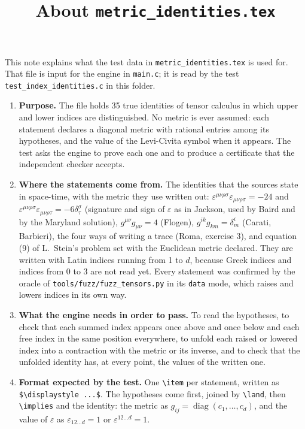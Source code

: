 \documentclass[11pt,a4paper]{article}
\title{About \texttt{metric\_identities.tex}}
\author{}
\date{}
\begin{document}
\maketitle
This note explains what the test data in \texttt{metric\_identities.tex} is used for. That file is input for the engine in \texttt{main.c}; it is read by the test \texttt{test\_index\_identities.c} in this folder.

\begin{enumerate}
\item \textbf{Purpose.} The file holds 35 true identities of tensor calculus in which upper and lower indices are distinguished. No metric is ever assumed: each statement declares a diagonal metric with rational entries among its hypotheses, and the value of the Levi-Civita symbol when it appears. The test asks the engine to prove each one and to produce a certificate that the independent checker accepts.

\item \textbf{Where the statements come from.} The identities that the sources state in space-time, with the metric they use written out: $\varepsilon^{\mu\nu\rho\sigma}\varepsilon_{\mu\nu\rho\sigma} = -24$ and $\varepsilon^{\mu\nu\rho\sigma}\varepsilon_{\mu\nu\rho\tau} = -6\delta^{\sigma}_{\tau}$ (signature and sign of $\varepsilon$ as in Jackson, used by Baird and by the Maryland solution), $g^{\mu\nu} g_{\mu\nu} = 4$ (Flogen), $g^{ik} g_{km} = \delta^{i}_{m}$ (Carati, Barbieri), the four ways of writing a trace (Roma, exercise 3), and equation (9) of L.~Stein's problem set with the Euclidean metric declared. They are written with Latin indices running from 1 to $d$, because Greek indices and indices from 0 to 3 are not read yet. Every statement was confirmed by the oracle of \texttt{tools/fuzz/fuzz\_tensors.py} in its \texttt{data} mode, which raises and lowers indices in its own way.

\item \textbf{What the engine needs in order to pass.} To read the hypotheses, to check that each summed index appears once above and once below and each free index in the same position everywhere, to unfold each raised or lowered index into a contraction with the metric or its inverse, and to check that the unfolded identity has, at every point, the values of the written one.

\item \textbf{Format expected by the test.} One \texttt{\textbackslash item} per statement, written as \texttt{\$\textbackslash displaystyle ...\$}. The hypotheses come first, joined by \texttt{\textbackslash land}, then \texttt{\textbackslash implies} and the identity: the metric as $g_{ij} = \operatorname{diag}(c_1, \dots, c_d)$, and the value of $\varepsilon$ as $\varepsilon_{12 \dots d} = 1$ or $\varepsilon^{12 \dots d} = 1$.


\end{enumerate}
\end{document}
